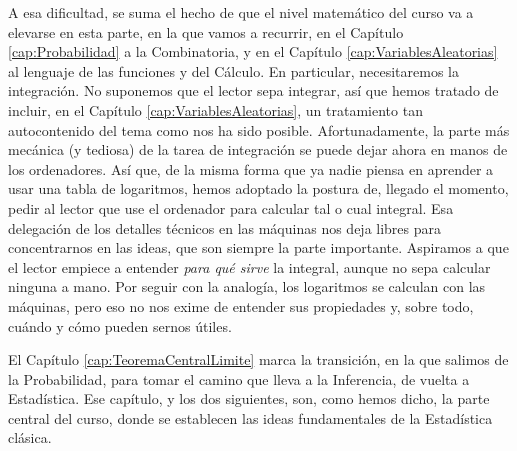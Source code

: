 A esa dificultad, se suma el hecho de que el nivel matemático del curso va a elevarse en esta
parte, en la que vamos a recurrir, en el Capítulo \ref{cap:Probabilidad} a la Combinatoria, y en el
Capítulo \ref{cap:VariablesAleatorias} al lenguaje de las funciones y del Cálculo. En particular,
necesitaremos la integración. No suponemos que el lector sepa integrar, así que hemos tratado de
incluir, en el Capítulo \ref{cap:VariablesAleatorias}, un tratamiento tan autocontenido del tema
como nos ha sido posible. Afortunadamente, la parte más mecánica (y tediosa) de la tarea de integración se
puede dejar ahora en manos de los ordenadores. Así que, de la misma forma que ya
nadie piensa en aprender a usar una tabla de logaritmos, hemos adoptado la postura de, llegado el
momento, pedir al lector que use el ordenador para calcular tal o cual integral. Esa delegación de los detalles técnicos en las máquinas nos deja libres para concentrarnos en las ideas, que son siempre la parte importante. Aspiramos a que el lector empiece a entender {\em para qué sirve} la integral, aunque no sepa calcular ninguna a mano. Por seguir con la analogía, los logaritmos se calculan con las máquinas, pero eso no nos exime de entender sus propiedades y, sobre todo, cuándo y cómo pueden sernos útiles.

El Capítulo \ref{cap:TeoremaCentralLimite} marca la transición, en la que salimos de la
Probabilidad, para tomar el camino que lleva a la Inferencia, de vuelta a Estadística. Ese
capítulo, y los dos siguientes, son, como hemos dicho, la parte central del curso, donde se
establecen las ideas fundamentales de la Estadística clásica.
